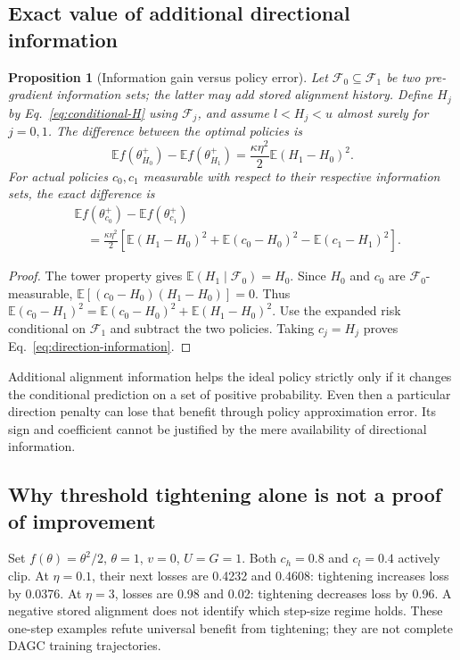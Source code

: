 \documentclass{article}
\newtheorem{proposition}{Proposition}
\begin{document}
\subsection{Exact value of additional directional information}
\begin{proposition}[Information gain versus policy error]
Let $\mathcal F_0\subseteq\mathcal F_1$ be two pre-gradient information sets;
the latter may add stored alignment history. Define $H_j$ by
Eq.~\eqref{eq:conditional-H} using $\mathcal F_j$, and assume
$l<H_j<u$ almost surely for $j=0,1$. The difference between the optimal
policies is
\begin{equation}
 \mathbb E f(\theta_{H_0}^+)-\mathbb E f(\theta_{H_1}^+)
 =\frac{\kappa\eta^2}{2}\mathbb E(H_1-H_0)^2.
 \label{eq:direction-information}
\end{equation}
For actual policies $c_0,c_1$ measurable with respect to their respective
information sets, the exact difference is
\begin{align}
 &\mathbb E f(\theta_{c_0}^+)-\mathbb E f(\theta_{c_1}^+)\\
 &\quad=\frac{\kappa\eta^2}{2}\left[
 \mathbb E(H_1-H_0)^2+\mathbb E(c_0-H_0)^2
 -\mathbb E(c_1-H_1)^2\right].
\end{align}
\end{proposition}
\begin{proof}
The tower property gives
$\mathbb E(H_1\mid\mathcal F_0)=H_0$.
Since $H_0$ and $c_0$ are $\mathcal F_0$-measurable,
$\mathbb E[(c_0-H_0)(H_1-H_0)]=0$. Thus
$\mathbb E(c_0-H_1)^2=
\mathbb E(c_0-H_0)^2+\mathbb E(H_1-H_0)^2$.
Use the expanded risk conditional on $\mathcal F_1$ and subtract the two
policies. Taking $c_j=H_j$ proves Eq.~\eqref{eq:direction-information}.
\end{proof}
Additional alignment information helps the ideal policy strictly only if it
changes the conditional prediction on a set of positive probability.
Even then a particular direction penalty can lose that benefit through policy
approximation error. Its sign and coefficient cannot be justified by the
mere availability of directional information.

\subsection{Why threshold tightening alone is not a proof of improvement}
Set $f(\theta)=\theta^2/2$, $\theta=1$, $v=0$, $U=G=1$.
Both $c_h=0.8$ and $c_l=0.4$ actively clip. At $\eta=0.1$, their next
losses are 0.4232 and 0.4608: tightening increases loss by 0.0376.
At $\eta=3$, losses are 0.98 and 0.02: tightening decreases loss by 0.96.
A negative stored alignment does not identify which step-size regime holds.
These one-step examples refute universal benefit from tightening; they are
not complete DAGC training trajectories.
\end{document}
